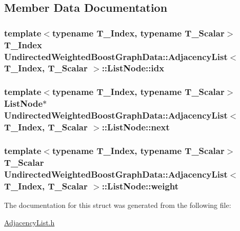 \subsection{Member Data Documentation}
\hypertarget{struct_undirected_weighted_graph_1_1_adjacency_list_1_1_list_node_ae35b343eda23b364db9d9239d9f0ce24}{
\subsubsection[{idx}]{\setlength{\rightskip}{0pt plus 5cm}template$<$typename T\+\_\+\+Index, typename T\+\_\+\+Scalar$>$ T\+\_\+\+Index {\bf Undirected\+Weighted\+BoostGraphData\+::\+Adjacency\+List}$<$ T\+\_\+\+Index, T\+\_\+\+Scalar $>$\+::List\+Node\+::idx}}\label{struct_undirected_weighted_graph_1_1_adjacency_list_1_1_list_node_ae35b343eda23b364db9d9239d9f0ce24}
\hypertarget{struct_undirected_weighted_graph_1_1_adjacency_list_1_1_list_node_a6f0bbab55afd9ce7a56a14d83816f141}{
\subsubsection[{next}]{\setlength{\rightskip}{0pt plus 5cm}template$<$typename T\+\_\+\+Index, typename T\+\_\+\+Scalar$>$ {\bf List\+Node}$\ast$ {\bf Undirected\+Weighted\+BoostGraphData\+::\+Adjacency\+List}$<$ T\+\_\+\+Index, T\+\_\+\+Scalar $>$\+::List\+Node\+::next}}\label{struct_undirected_weighted_graph_1_1_adjacency_list_1_1_list_node_a6f0bbab55afd9ce7a56a14d83816f141}
\hypertarget{struct_undirected_weighted_graph_1_1_adjacency_list_1_1_list_node_ad7d0aedb78ca2bf0ae2e9c55a8a32596}{
\subsubsection[{weight}]{\setlength{\rightskip}{0pt plus 5cm}template$<$typename T\+\_\+\+Index, typename T\+\_\+\+Scalar$>$ T\+\_\+\+Scalar {\bf Undirected\+Weighted\+BoostGraphData\+::\+Adjacency\+List}$<$ T\+\_\+\+Index, T\+\_\+\+Scalar $>$\+::List\+Node\+::weight}}\label{struct_undirected_weighted_graph_1_1_adjacency_list_1_1_list_node_ad7d0aedb78ca2bf0ae2e9c55a8a32596}


The documentation for this struct was generated from the following file\+:\begin{DoxyCompactItemize}
\item 
\hyperlink{_adjacency_list_8h}{Adjacency\+List.\+h}\end{DoxyCompactItemize}
